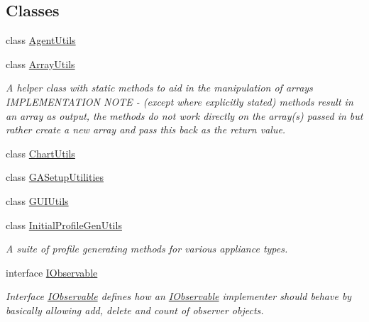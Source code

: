 \subsection*{Classes}
\begin{DoxyCompactItemize}
\item 
class \hyperlink{classuk_1_1ac_1_1dmu_1_1iesd_1_1cascade_1_1util_1_1_agent_utils}{Agent\-Utils}
\item 
class \hyperlink{classuk_1_1ac_1_1dmu_1_1iesd_1_1cascade_1_1util_1_1_array_utils}{Array\-Utils}
\begin{DoxyCompactList}\small\item\em A helper class with static methods to aid in the manipulation of arrays I\-M\-P\-L\-E\-M\-E\-N\-T\-A\-T\-I\-O\-N N\-O\-T\-E -\/ (except where explicitly stated) methods result in an array as output, the methods do not work directly on the array(s) passed in but rather create a new array and pass this back as the return value. \end{DoxyCompactList}\item 
class \hyperlink{classuk_1_1ac_1_1dmu_1_1iesd_1_1cascade_1_1util_1_1_chart_utils}{Chart\-Utils}
\item 
class \hyperlink{classuk_1_1ac_1_1dmu_1_1iesd_1_1cascade_1_1util_1_1_g_a_setup_utilities}{G\-A\-Setup\-Utilities}
\item 
class \hyperlink{classuk_1_1ac_1_1dmu_1_1iesd_1_1cascade_1_1util_1_1_g_u_i_utils}{G\-U\-I\-Utils}
\item 
class \hyperlink{classuk_1_1ac_1_1dmu_1_1iesd_1_1cascade_1_1util_1_1_initial_profile_gen_utils}{Initial\-Profile\-Gen\-Utils}
\begin{DoxyCompactList}\small\item\em A suite of profile generating methods for various appliance types. \end{DoxyCompactList}\item 
interface \hyperlink{interfaceuk_1_1ac_1_1dmu_1_1iesd_1_1cascade_1_1util_1_1_i_observable}{I\-Observable}
\begin{DoxyCompactList}\small\item\em Interface {\ttfamily \hyperlink{interfaceuk_1_1ac_1_1dmu_1_1iesd_1_1cascade_1_1util_1_1_i_observable}{I\-Observable}} defines how an \hyperlink{interfaceuk_1_1ac_1_1dmu_1_1iesd_1_1cascade_1_1util_1_1_i_observable}{I\-Observable} implementer should behave by basically allowing add, delete and count of observer objects. \end{DoxyCompactList}\item 

\end{DoxyCompactItemize}
